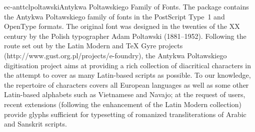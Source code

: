 \documentclass{ddltxtyp}
\begin{document}
\begin{package}{ec-anttcl}{poltawski}{Antykwa Poltawskiego Family of Fonts.}
The package contains the Antykwa Poltawskiego family of fonts
in the PostScript Type~1 and OpenType formats. The original
font was designed in the twenties of the XX century by the
Polish typographer Adam Poltawski (1881--1952). Following the
route set out by the Latin Modern and {\TeX} Gyre projects
(http://www.gust.org.pl/projects/e-foundry), the Antykwa
Poltawskiego digitisation project aims at providing a rich
collection of diacritical characters in the attempt to cover as
many Latin-based scripts as possible. To our knowledge, the
repertoire of characters covers all European languages as well
as some other Latin-based alphabets such as Vietnamese and
Navajo; at the request of users, recent extensions (following
the enhancement of the Latin Modern collection) provide glyphs
sufficient for typesetting of romanized transliterations of
Arabic and Sanskrit scripts. %
\end{package}
\end{document}
